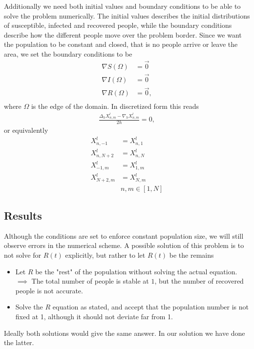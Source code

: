 Additionally we need both initial values and boundary conditions to be able to solve the problem numerically.
The initial values describes the initial distributions of susceptible, infected and recovered people, while
the boundary conditions describe how the different people move over the problem border. Since we want the population to be constant and closed, that is no people arrive or leave
the area, we set the boundary conditions to be
\begin{equation}
    \begin{split}
        \nabla S(\Omega) &= \Vec{0} \\
        \nabla I(\Omega) &= \Vec{0} \\
        \nabla R(\Omega) &= \Vec{0}, \\
    \end{split}
\end{equation}
where $\Omega$ is the edge of the domain. In discretized form this reads
\begin{equation}
    \begin{split}
        \frac{\Delta_h X_{n,m}^l - \nabla_h X_{n,m}^l}{2h} = 0,
    \end{split}
\end{equation}
or equivalently
\begin{equation}
    \begin{split}
        X_{n,-1}^l &= X_{n, 1}^l \\
        X_{n,N+2}^l &= X_{n, N}^l \\
        X_{-1,m}^l &= X_{1, m}^l \\
        X_{N+2,m}^l &= X_{N, m}^l \\
        & n,m \in [1, N]
    \end{split}
\end{equation}


\subsection{Results}
Although the conditions are set to enforce constant population size, we will still observe errors in the numerical scheme. A possible solution of this problem is to not 
solve for $R(t)$ explicitly, but rather to let $R(t)$ be the remains
\begin{itemize}
    \item Let $R$ be the "rest" of the population without solving the actual equation. $\implies$ The total number of people is stable at $1$, but the number of recovered people is not accurate.
    \item Solve the $R$ equation as stated, and accept that the population number is not fixed at 1, although it should not deviate far from 1.
\end{itemize}
Ideally both solutions would give the same answer.
In our solution we have done the latter.

